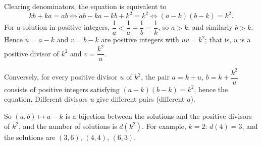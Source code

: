 Clearing denominators, the equation is equivalent to
\[
kb+ka=ab\iff ab-ka-kb+k^2=k^2\iff(a-k)(b-k)=k^2 .
\]
For a solution in positive integers, $\dfrac{1}{a}<\dfrac{1}{a}+\dfrac{1}{b}=\dfrac{1}{k}$, so $a>k$, and similarly $b>k$. Hence $u=a-k$ and $v=b-k$ are positive integers with $uv=k^2$; that is, $u$ is a positive divisor of $k^2$ and $v=\dfrac{k^2}{u}$.

Conversely, for every positive divisor $u$ of $k^2$, the pair $a=k+u$, $b=k+\dfrac{k^2}{u}$ consists of positive integers satisfying $(a-k)(b-k)=k^2$, hence the equation. Different divisors $u$ give different pairs (different $a$).

So $(a,b)\mapsto a-k$ is a bijection between the solutions and the positive divisors of $k^2$, and the number of solutions is $\boxed{d(k^2)}$. For example, $k=2$: $d(4)=3$, and the solutions are $(3,6)$, $(4,4)$, $(6,3)$.
